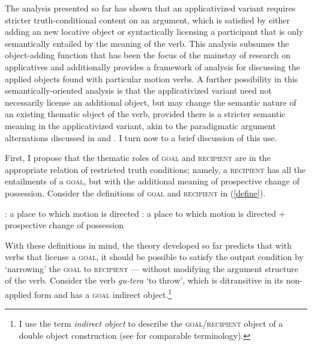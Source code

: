 \documentclass[output=paper]{langsci/langscibook}
\begin{document}
The analysis presented so far has shown that an applicativized variant requires stricter truth-conditional content on an argument, which is satisfied by either adding an new locative object or syntactically licensing a participant that is only semantically entailed by the meaning of the verb. This analysis subsumes the object-adding function that has been the focus of the mainstay of research on applicatives and additionally provides a framework of analysis for discussing the applied objects found with particular motion verbs. A further possibility in this semantically-oriented analysis is that the applicativized variant need not necessarily license an additional object, but may change the semantic nature of an existing thematic object of the verb, provided there is a stricter semantic meaning in the applicativized variant, akin to the paradigmatic argument alternations discussed in \citet{ackermanmoore:2001} and \citet{beavers:2010b}. I turn now to a brief discussion of this use.

First, I propose that the thematic roles of {\scshape goal} and {\scshape recipient} are in the appropriate relation of restricted truth conditions; namely, a {\scshape recipient} has all the entailments of a {\scshape goal}, but with the additional meaning of prospective change of possession. Consider the definitions of {\scshape goal} and {\scshape recipient} in (\ref{define}).

\begin{exe}
      \ex\label{define}\begin{xlist} 
	      : a place to which motion is directed 
	      : a place to which motion is directed + prospective change of possession
      \end{xlist}
\end{exe}
With these definitions in mind, the theory developed so far predicts that with verbs that license a {\scshape goal}, it should be possible to satisfy the output condition by  `narrowing' the {\scshape goal} to {\scshape recipient} --- without modifying the argument structure of the verb. Consider the verb \emph{gu-tera} `to throw', which is ditransitive in its non-applied form and has a {\scshape goal} indirect object.\footnote{I use the term \emph{indirect object} to describe the {\scshape goal/recipient} object of a double object construction (see \citealt{beavers:2011a} for comparable terminology).}
\end{document}
